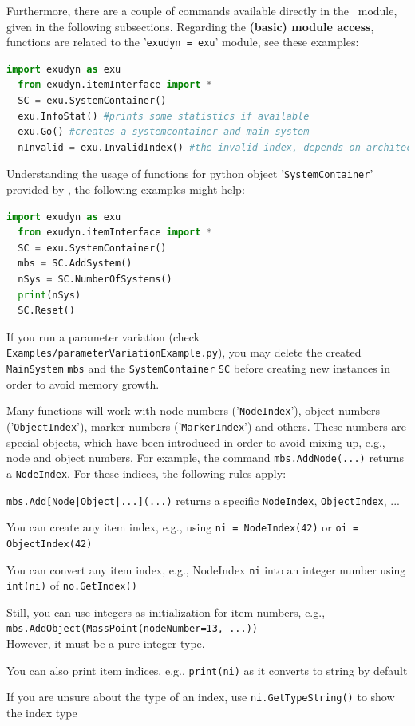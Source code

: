 \documentclass[11pt,a4paper]{book}
\begin{document}
Furthermore, there are a couple of commands available directly in the \codeName\ module, given in the following subsections.
Regarding the {\bf (basic) module access}, functions are related to the '\texttt{exudyn = exu}' module, see these examples:
\begin{lstlisting}[language=Python, firstnumber=14]
  import exudyn as exu
  from exudyn.itemInterface import *
  SC = exu.SystemContainer()
  exu.InfoStat() #prints some statistics if available
  exu.Go() #creates a systemcontainer and main system
  nInvalid = exu.InvalidIndex() #the invalid index, depends on architecture and version
\end{lstlisting} \vspace{12pt}
%
Understanding the usage of functions for python object '\texttt{SystemContainer}' provided by \codeName, the following examples might help:
\begin{lstlisting}[language=Python, firstnumber=14]
  import exudyn as exu
  from exudyn.itemInterface import *
  SC = exu.SystemContainer()
  mbs = SC.AddSystem()
  nSys = SC.NumberOfSystems()
  print(nSys)
  SC.Reset()
\end{lstlisting} \vspace{12pt}
%
If you run a parameter variation (check \texttt{Examples/parameterVariationExample.py}), you may delete the created \texttt{MainSystem} \texttt{mbs} and the \texttt{SystemContainer} \texttt{SC} before creating new instances in order to avoid memory growth.

Many functions will work with node numbers ('\texttt{NodeIndex}'), object numbers ('\texttt{ObjectIndex}'), marker numbers ('\texttt{MarkerIndex}') and others. These numbers are special objects, which have been introduced in order to avoid mixing up, e.g., node and object numbers.
For example, the command \texttt{mbs.AddNode(...)} returns a \texttt{NodeIndex}. For these indices, the following rules apply:
\bi
	\item \texttt{mbs.Add[Node|Object|...](...)} returns a specific \texttt{NodeIndex}, \texttt{ObjectIndex}, ...
	\item You can create any item index, e.g., using \texttt{ni = NodeIndex(42)} or \texttt{oi = ObjectIndex(42)}
	\item You can convert any item index, e.g., NodeIndex \texttt{ni} into an integer number using \texttt{int(ni)} of \texttt{no.GetIndex()}
	\item Still, you can use integers as initialization for item numbers, e.g., \\
	      \texttt{mbs.AddObject(MassPoint(nodeNumber=13, ...))}\\
				However, it must be a pure integer type.
	\item You can also print item indices, e.g., \texttt{print(ni)} as it converts to string by default
	\item If you are unsure about the type of an index, use \texttt{ni.GetTypeString()} to show the index type
\ei
\end{document}
